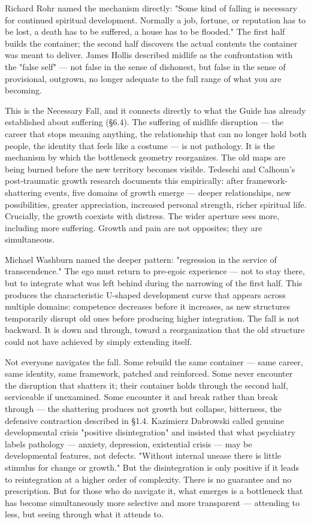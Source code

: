 Richard Rohr named the mechanism directly: "Some kind of falling is necessary for continued spiritual development. Normally a job, fortune, or reputation has to be lost, a death has to be suffered, a house has to be flooded." The first half builds the container; the second half discovers the actual contents the container was meant to deliver. James Hollis described midlife as the confrontation with the "false self" — not false in the sense of dishonest, but false in the sense of provisional, outgrown, no longer adequate to the full range of what you are becoming.


This is the Necessary Fall, and it connects directly to what the Guide has already established about suffering (§6.4). The suffering of midlife disruption — the career that stops meaning anything, the relationship that can no longer hold both people, the identity that feels like a costume — is not pathology. It is the mechanism by which the bottleneck geometry reorganizes. The old maps are being burned before the new territory becomes visible. Tedeschi and Calhoun's post-traumatic growth research documents this empirically: after framework-shattering events, five domains of growth emerge — deeper relationships, new possibilities, greater appreciation, increased personal strength, richer spiritual life. Crucially, the growth coexists with distress. The wider aperture sees more, including more suffering. Growth and pain are not opposites; they are simultaneous.


Michael Washburn named the deeper pattern: "regression in the service of transcendence." The ego must return to pre-egoic experience — not to stay there, but to integrate what was left behind during the narrowing of the first half. This produces the characteristic U-shaped development curve that appears across multiple domains: competence decreases before it increases, as new structures temporarily disrupt old ones before producing higher integration. The fall is not backward. It is down and through, toward a reorganization that the old structure could not have achieved by simply extending itself.


Not everyone navigates the fall. Some rebuild the same container — same career, same identity, same framework, patched and reinforced. Some never encounter the disruption that shatters it; their container holds through the second half, serviceable if unexamined. Some encounter it and break rather than break through — the shattering produces not growth but collapse, bitterness, the defensive contraction described in §1.4. Kazimierz Dabrowski called genuine developmental crisis "positive disintegration" and insisted that what psychiatry labels pathology — anxiety, depression, existential crisis — may be developmental features, not defects. "Without internal unease there is little stimulus for change or growth." But the disintegration is only positive if it leads to reintegration at a higher order of complexity. There is no guarantee and no prescription. But for those who do navigate it, what emerges is a bottleneck that has become simultaneously more selective and more transparent — attending to less, but seeing through what it attends to.


